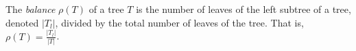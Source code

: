 \documentclass[12pt]{article}
\begin{document}
The  \emph{balance} $\rho(T)$ of a tree $T$ is the number of leaves of the 
left subtree of a tree, denoted 
$|T_l|$, divided by the total number of leaves of the tree. 
That is, $\rho (T) = \frac{|T_l|}{|T|}$.
\end{document}
